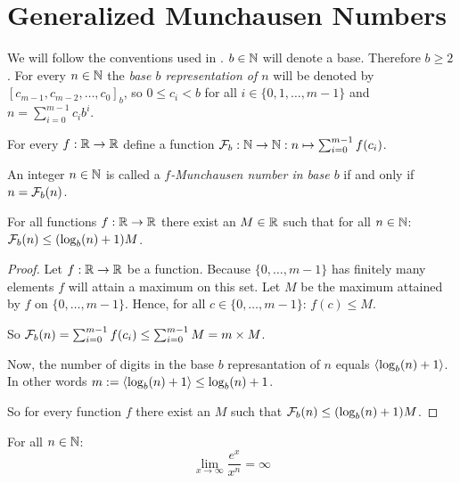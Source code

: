 \section*{Generalized Munchausen Numbers}

We will follow the conventions used in \cite{dvb}. $b\in\mathbb{N}$ will denote a base.
Therefore $b \ge 2$. For every $n \in \mathbb{N}$ the \emph{base $b$ representation
of $n$} will be denoted by $[c_{m-1}, c_{m-2}, \ldots, c_{0}]_{b}$, so 
$0 \le c_{i} < b$ for all $i \in \{0,1,\ldots,m-1\}$ and 
$n = \sum_{i=0}^{m-1} c_{i}b^{i}$.

For every $f : \mathbb{R} \rightarrow \mathbb{R}$ define a function $\mathcal{F}_{b} : \mathbb{N} \rightarrow
\mathbb{N} : n \mapsto \sum_{i=0}^{m-1} f(c_{i})$.

\begin{definition}
	An integer $n \in \mathbb{N}$ is called a \emph{$f$-Munchausen number in base $b$}
	if and only if $n = \mathcal{F}_{b}(n)$.
\end{definition}


\begin{proposition}
	For all functions $f : \mathbb{R} \rightarrow \mathbb{R}$ there exist an 
	$M \in \mathbb{R}$ such that for all $n \in \mathbb{N}$: $\mathcal{F}_{b}(n) \le (\log_{b}(n) + 1) M$.
\end{proposition}

\begin{proof}
	Let $f : \mathbb{R} \rightarrow \mathbb{R}$ be a function. Because $\{0,\ldots,m-1\}$ has 
	finitely many elements $f$ will attain a maximum on this set. Let $M$ be the
	maximum	attained by $f$ on $\{0,\ldots,m-1\}$. Hence, for all 
	$c \in \{0,\ldots,m-1\}$: $f(c) \le M$.
	
	So $\mathcal{F}_{b}(n) = \sum_{i=0}^{m-1} f(c_{i}) \le 
	\sum_{i=0}^{m-1} M = m \times M$.
	
	Now, the number of digits in the base $b$ represantation of $n$ equals 
	$\langle\log_{b}(n) + 1\rangle$. In other words $m := \langle\log_{b}(n) + 1\rangle 
	\le \log_{b}(n) + 1$.
	
	So for every function $f$ there exist an $M$ such that 
	$\mathcal{F}_{b}(n) \le (\log_{b}(n) + 1) M$.
\end{proof}

\begin{proposition}
	For all $n \in \mathbb{N}$: 
	\[
		\lim_{x \rightarrow \infty} \frac{e^{x}}{x^{n}} = \infty
	\]
\end{proposition}

